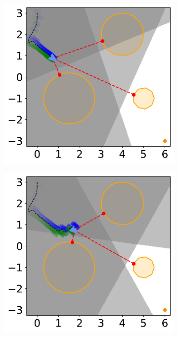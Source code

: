 \begin{figure}[H]
    \begin{subfigure}{0.35\textwidth}
        \centering
        \includegraphics[width=\textwidth]{figures/Simulations/sim1circles_delta/frame_2.pdf}
    \end{subfigure}%
    \hspace{1em}
    \begin{subfigure}{0.35\textwidth}
        \centering
        \includegraphics[width=\textwidth]{figures/Simulations/sim1circles_delta/frame_3.pdf}
    \end{subfigure}%
    

\end{figure}
